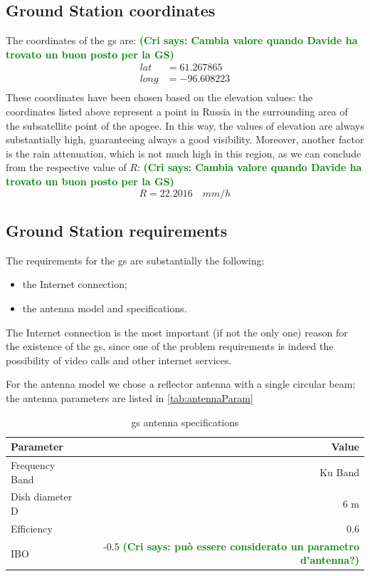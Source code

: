 \documentclass[11pt,a4paper,titlepage]{article}
\newcommand{\cri}[1]{\textcolor{green}{\textbf{(Cri says: #1)}}}
\begin{document}
	\subsection{Ground Station coordinates}
		The coordinates of the \gls{gs} are: \cri{Cambia valore quando Davide ha trovato un buon posto per la GS}
		\begin{align}
		lat &= 61.267865\\ 
		long &= -96.608223\\
		\end{align}
		These coordinates have been chosen based on the elevation values: the coordinates listed above represent a point in 				Russia in the surrounding area of the subsatellite point of the apogee. In this way, the values of elevation are always 				substantially high, guaranteeing always a good visibility. Moreover, another factor is the rain attenuation, which is not 			much high in this region, as we can conclude from the respective value of $R$:  \cri{Cambia valore quando Davide ha trovato un buon posto per la GS}
		\begin{equation}
		R = 22.2016 \quad mm/h
		\end{equation}
	\subsection{Ground Station requirements}
		The requirements for the \gls{gs} are substantially the following:
		\begin{itemize}
			\item the Internet connection;
			\item the antenna model and specifications.
		\end{itemize}

		The Internet connection is the most important (if not the only one) reason for the existence of the \gls{gs}, since one of 			the problem requirements is indeed the possibility of video calls and other internet services.

		For the antenna model we chose a reflector antenna with a single circular beam; the antenna parameters are 					listed in \autoref{tab:antennaParam}
		\begin{table}
			\centering
			\begin{tabular}{lr}
			\toprule
			Parameter & Value\\
			\midrule
			Frequency Band & Ku Band\\
			Dish diameter D & 6 m\\
			Efficiency & 0.6\\
			IBO & -0.5 \cri{può essere considerato un parametro d'antenna?}\\
			\bottomrule
			\end{tabular}
			\caption{\gls{gs} antenna specifications}
			\label{tab:antennaParam}
		\end{table}
\end{document}

